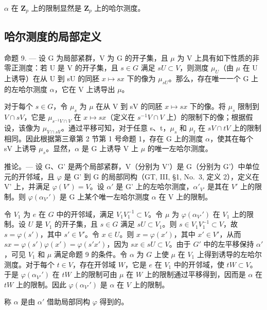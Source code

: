 \(\alpha\) 在 \(\mathbf{Z}_p\) 上的限制显然是 \(\mathbf{Z}_p\) 上的哈尔测度。

\subsection{哈尔测度的局部定义}

命题 9. --- 设 G 为局部紧群，V 为 G 的开子集，且 \(\mu\) 为 V 上具有如下性质的非零正测度：若 U 是 V 的开子集，且 \(s \in G\) 满足 \(sU \subset V\)，则测度 \(\mu_{U}\)（由 \(\mu\) 在 U 上诱导）在从 U 到 sU 的同胚 \(x \mapsto sx\) 下的像为 \(\mu_{sU}\)。那么，存在唯一一个 G 上的左哈尔测度 \(\alpha\)，它在 V 上诱导出 \(\mu\)。

对于每个 \(s \in G\)，令 \(\mu_{s}\) 为 \(\mu\) 在从 V 到 sV 的同胚 \(x \mapsto sx\) 下的像。将 \(\mu_{s}\) 限制到 \(V \cap sV\)，它是 \(\mu_{s^{-1}V \cap V}\) 在 \(x \mapsto sx\)（定义在 \(s^{-1}V \cap V\) 上）的限制下的像；根据假设，该像为 \(\mu_{V \cap sV}\)。通过平移可知，对于任意 s、t，\(\mu_{s}\) 和 \(\mu_{t}\) 在 \(sV \cap tV\) 上的限制相同。因此根据第三章第 2 节第 1 号命题 1，存在 G 上的测度 \(\alpha\)，使其在每个 sV 上诱导 \(\mu_{s}\)。显然，\(\alpha\) 是 G 上诱导 V 上 \(\mu\) 的唯一左哈尔测度。

推论。--- 设 G、G' 是两个局部紧群，V（分别为 V'）是 G（分别为 G'）中单位元的开邻域，且 \(\varphi\) 是 G' 到 G 的局部同构（GT, III, §1, No.~3, 定义 2），定义在 V' 上，并满足 \(\varphi(V') = V\)。设 \(\alpha'\) 是 G' 上的左哈尔测度，\(\alpha'_{V'}\) 是其在 \(V'\) 上的限制。则 \(\varphi(\alpha_{V'}')\) 是 G 上某个唯一左哈尔测度 \(\alpha\) 在 V 上的限制。

令 \(V_1\) 为 \(e\) 在 \(G\) 中的开邻域，满足 \(V_1V_1^{-1} \subset V\)。令 \(\mu\) 为 \(\varphi(\alpha_{V'}')\) 在 \(V_1\) 上的限制。设 \(U\) 是 \(V_1\) 的开子集，且 \(s \in G\) 满足 \(sU \subset V_1\)。则 \(s \in V_1V_1^{-1} \subset V\)，故 \(s = \varphi(s')\)，其中 \(s' \in V'\)。令 \(x \in U\)。则 \(x = \varphi(x')\)，其中 \(x' \in V'\)，从而 \(sx = \varphi(s')\varphi(x') = \varphi(s'x')\)，因为 \(sx \in sU \subset V\)。由于 \(G'\) 中的左平移保持 \(\alpha'\)，可见 \(V_1\) 和 \(\mu\) 满足命题 9 的条件。令 \(\alpha\) 为 \(G\) 上使 \(\mu\) 在 \(V_1\) 上得到诱导的左哈尔测度。对于每个 \(t \in V\)，存在开邻域 \(W\)，它是 \(e\) 在 \(V_1\) 中的开邻域，使 \(tW \subset V\)。于是 \(\varphi(\alpha_{V'}')\) 在 \(tW\) 上的限制可由 \(\mu\) 在 \(W\) 上的限制通过平移得到，因而是 \(\alpha\) 在 \(tW\) 上的限制。因此 \(\varphi(\alpha_{V'}')\) 是 \(\alpha\) 在 \(V\) 上的限制。

称 \(\alpha\) 是由 \(\alpha'\) 借助局部同构 \(\varphi\) 得到的。

